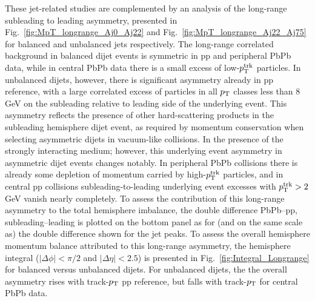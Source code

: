 These jet-related studies are complemented by an analysis of the long-range subleading to leading asymmetry, presented in Fig.~\ref{fig:MpT_longrange_Aj0_Aj22}  and Fig.~\ref{fig:MpT_longrange_Aj22_Aj75} for balanced and unbalanced jets respectively.  The long-range correlated background in balanced dijet events is symmetric in pp and peripheral PbPb data, while in central PbPb data there is a small excess of low-$p_{\rm T}^{\rm trk}$ particles.  In unbalanced dijets, however, there is significant asymmetry already in pp reference, with a large correlated excess of particles in all $p_{\rm T}$ classes less than 8 GeV on the subleading relative to leading side of the underlying event.  This asymmetry reflects the presence of other hard-scattering products in the subleading hemisphere dijet event, as required by momentum conservation when selecting asymmetric dijets in vacuum-like collisions.  In the presence of the strongly interacting medium;  however, this underlying event asymmetry in asymmetric dijet events changes notably.  In peripheral PbPb collisions there is already some depletion of momentum carried by high-$p_{\rm T}^{\rm trk}$ particles, and in central pp collisions subleading-to-leading underlying event excesses with $p_{\rm T}^{\rm trk} > 2$ GeV vanish nearly completely.  To assess the contribution of this long-range asymmetry to the total hemisphere imbalance, the double difference PbPb--pp, subleading--leading is plotted on the bottom panel as for (and on the same scale as) the double difference shown for the jet peaks.  To assess the overall hemisphere momentum balance attributed to this long-range asymmetry, the hemisphere integral ($|\Delta\phi|<\pi/2$ and $|\Delta\eta|<2.5$) is presented in Fig.~\ref{fig:Integral_Longrange} for balanced versus unbalanced dijets.  For unbalanced dijets, the the overall asymmetry rises with track-$p_{\rm T}$ pp reference, but falls with track-$p_{\rm T}$ for central PbPb data.  

